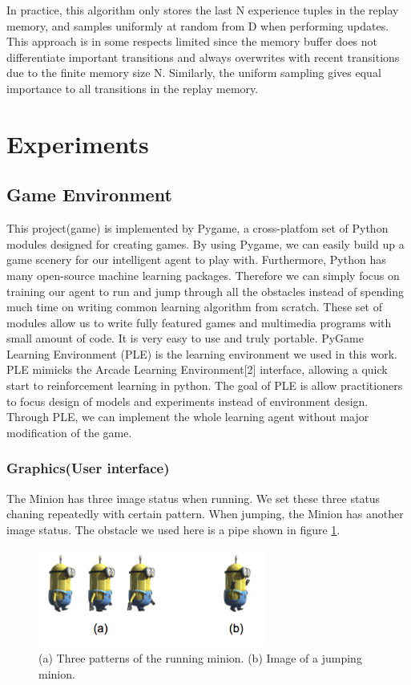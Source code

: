 \documentclass{acmsiggraph}
\begin{document}
In practice, this algorithm only stores the last N experience tuples in the replay memory, and samples uniformly at random from D when performing updates. This approach is in some respects limited since the memory buffer does not differentiate important transitions and always overwrites with recent transitions due to the finite memory size N. Similarly, the uniform sampling gives equal importance to all transitions in the replay memory. 


\section{Experiments}
\subsection{Game Environment} 
This project(game) is implemented by Pygame, a cross-platfom set of Python modules designed for creating games. By using Pygame, we can easily build up a game scenery for our intelligent agent to play with. Furthermore, Python has many open-source machine learning packages. Therefore we can simply focus on training our agent to run and jump through all the obstacles instead of spending much time on writing common learning algorithm from scratch. These set of modules allow us to write fully featured games and multimedia programs with small amount of code. It is very easy to use and truly portable. PyGame Learning Environment (PLE) is the learning environment we used in this work. PLE mimicks the Arcade Learning Environment[2] interface, allowing a quick start to reinforcement learning in python. The goal of PLE is allow practitioners to focus design of models and experiments instead of environment design. Through PLE, we can implement the whole learning agent without major modification of the game.

\subsubsection{Graphics(User interface)}
The Minion has three image status when running. We set these three status chaning repeatedly with certain pattern. When jumping, the Minion has another image status. The obstacle we used here is a pipe shown in figure \ref{fig:minion}.


\begin{figure}[ht]
  \centering
  \includegraphics[width=3.0in]{../fig/minion.png}
  \caption{(a) Three patterns of the running minion. (b) Image of a jumping minion.}
  \label{fig:minion}
\end{figure}
\end{document}
